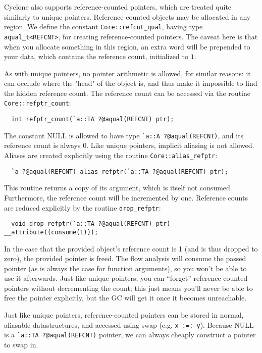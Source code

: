 Cyclone also supports reference-counted pointers, which are treated
quite similarly to unique pointers.  Reference-counted objects may be
allocated in any region. We define the constant
\texttt{Core::refcnt\_qual}, having type \texttt{aqual\_t<REFCNT>}, for
creating reference-counted pointers.  The caveat here is that when you
allocate something in this region, an extra word will be prepended to
your data, which contains the reference count, initialized to $1$.

As with unique pointers, no pointer arithmetic is allowed, for similar
reasons: it can occlude where the "head" of the object is, and thus make
it impossible to find the hidden reference count.  The reference count
can be accessed via the routine \texttt{Core::refptr\_count}:
\begin{verbatim}
  int refptr_count(`a::TA ?@aqual(REFCNT) ptr);
\end{verbatim} %
The constant NULL is allowed to have type
\verb+`a::A ?@aqual(REFCNT)+, and its reference count is always 0.
Like unique pointers, implicit aliasing is not allowed.  Aliases are
created explicitly using the routine \texttt{Core::alias\_refptr}:
\begin{verbatim}
  `a ?@aqual(REFCNT) alias_refptr(`a::TA ?@aqual(REFCNT) ptr);
\end{verbatim} %
This routine returns a copy of its argument, which is itself not consumed.
Furthermore, the reference count will be incremented by one.  Reference
counts are reduced explicitly by the routine \texttt{drop\_refptr}:
\begin{verbatim}
  void drop_refptr(`a::TA ?@aqual(REFCNT) ptr) __attribute((consume(1)));
\end{verbatim}
In the case that the provided object's reference count is 1 (and is thus
dropped to zero), the provided pointer is freed.  The flow analysis will
consume the passed pointer (as is always the case for function arguments),
so you won't be able to use it afterwards.  Just like unique pointers, you
can ``forget'' reference-counted pointers without decrementing the count;
this just means you'll never be able to free the pointer explicitly, but the
GC will get it once it becomes unreachable.

Just like unique pointers, reference-counted pointers can be stored in
normal, aliasable datastructures, and accessed using swap (e.g. \texttt{x
:=: y}).  Because NULL is a \verb+`a::TA ?@aqual(REFCNT)+ pointer, we can always
cheaply construct a pointer to swap in.  

